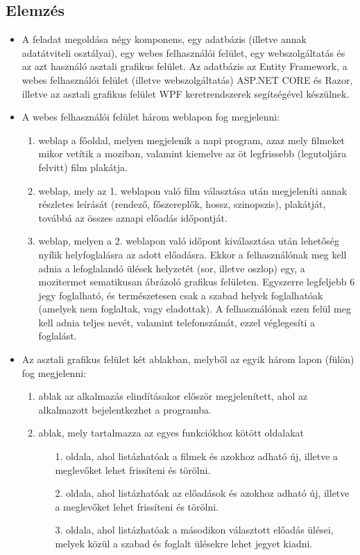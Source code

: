\documentclass{article}
\begin{document}
	\subsection*{Elemzés}
	\begin{itemize}
		\item A feladat megoldása négy komponens, egy adatbázis (illetve annak adatátviteli osztályai), egy webes felhasználói felület, egy webszolgáltatás és az azt használó asztali grafikus felület. Az adatbázis az Entity Framework, a webes felhasználói felület (illetve webszolgáltatás) ASP.NET CORE és Razor, illetve az asztali grafikus felület WPF keretrendszerek segítségével készülnek.
		\item A webes felhasználói felület három weblapon fog megjelenni:
		\begin{enumerate}
			\item weblap a főoldal, melyen megjelenik a napi program, azaz mely filmeket mikor vetítik a moziban, valamint kiemelve az öt legfrissebb (legutoljára felvitt) film plakátja.
			\item weblap, mely az 1. weblapon való film választása után megjeleníti annak részletes leírását (rendező, főszereplők, hossz, szinopszis), plakátját, továbbá az összes aznapi előadás időpontját.
			\item weblap, melyen a 2. weblapon való időpont kiválasztása után lehetőség nyílik helyfoglalásra az adott előadásra. Ekkor a felhasználónak meg kell adnia a lefoglalandó ülések helyzetét (sor, illetve oszlop) egy, a mozitermet sematikusan ábrázoló grafikus felületen. Egyszerre legfeljebb 6 jegy foglalható, és természetesen csak a szabad helyek foglalhatóak (amelyek nem foglaltak, vagy eladottak). A felhasználónak ezen felül meg kell adnia teljes nevét, valamint telefonszámát, ezzel véglegesíti a foglalást.
		\end{enumerate}
		\item Az asztali grafikus felület két ablakban, melyből az egyik három lapon (fülön) fog megjelenni:
		\begin{enumerate}
			\item ablak az alkalmazás elindításakor először megjelenített, ahol az alkalmazott bejelentkezhet a programba.
			\item ablak, mely tartalmazza az egyes funkciókhoz kötött oldalakat
			\begin{enumerate}
				\item[1.] oldala, ahol listázhatóak a filmek és azokhoz adható új, illetve a meglevőket lehet frissíteni és törölni.
				\item[2.] oldala, ahol listázhatóak az előadások és azokhoz adható új, illetve a meglevőket lehet frissíteni és törölni.
				\item[3.] oldala, ahol listázhatóak a másodikon választott előadás ülései, melyek közül a szabad és foglalt ülésekre lehet jegyet kiadni.
			\end{enumerate}
		\end{enumerate}
	\end{itemize}
\end{document}
